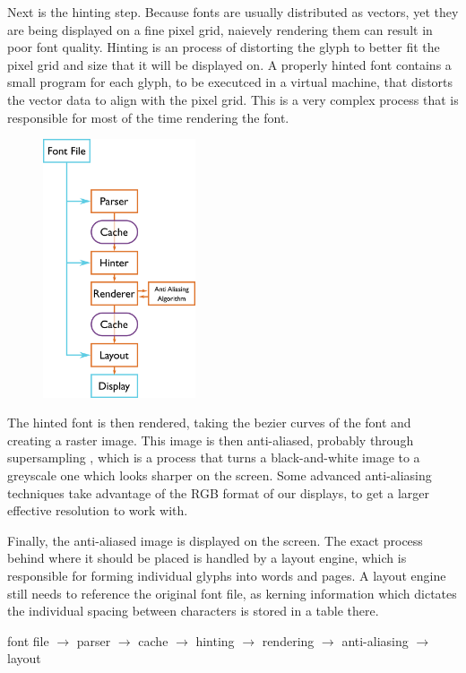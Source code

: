 \documentclass{report}
\begin{document}
Next is the hinting step. Because fonts are usually distributed as vectors, yet
they are being displayed on a fine pixel grid, naievely rendering them can
result in poor font quality. Hinting is an process of distorting the glyph to
better fit the pixel grid and size that it will be displayed on. A properly
hinted font contains a small program for each glyph, to be executced in a
virtual machine, that distorts the vector data to align with the pixel grid.
This is a very complex process that is responsible for most of the time
rendering the font.
\begin{figure}
  \centering
  \includegraphics[width=0.4\textwidth]{fontpipelineimg}
\end{figure}

The hinted font is then rendered, taking the bezier curves of the font and
creating a raster image. This image is then anti-aliased, probably through
supersampling , which is a process that turns a
black-and-white image to a greyscale one which looks sharper on the screen. Some
advanced anti-aliasing techniques take advantage of the RGB format of our
displays, to get a larger effective resolution to work with.

Finally, the anti-aliased image is displayed on the screen. The exact process
behind where it should be placed is handled by a layout engine, which is
responsible for forming individual glyphs into words and pages. A layout engine
still needs to reference the original font file, as kerning information which
dictates the individual spacing between characters is stored in a table there.

font file $\rightarrow$ parser $\rightarrow$ cache $\rightarrow$ hinting $\rightarrow$
rendering $\rightarrow$ anti-aliasing $\rightarrow$ layout
\end{document}

